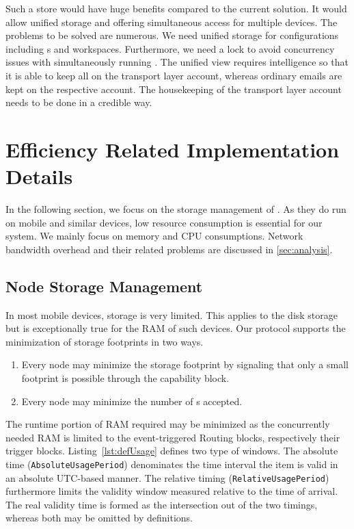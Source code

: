 Such a store would have huge benefits compared to the current solution. It would allow unified storage and offering simultaneous access for multiple devices. The problems to be solved are numerous. We need unified storage for configurations including s and workspaces. Furthermore, we need a lock to avoid concurrency issues with simultaneously running \VortexNodes{}. The unified view requires intelligence so that it is able to keep all \VortexMessages{} on the transport layer account, whereas ordinary emails are kept on the respective account. The housekeeping of the transport layer account needs to be done in a credible way. 

\chapter{Efficiency Related Implementation Details}\label{sec:efficiencyImplementation}
In the following section, we focus on the storage management of \VortexNodes{}. As they do run on mobile and similar devices, low resource consumption is essential for our system. We mainly focus on memory and CPU consumptions. Network bandwidth overhead and their related problems are discussed in \cref{sec:analysis}.

\section{Node Storage Management}
In most mobile devices, storage is very limited. This applies to the disk storage but is exceptionally true for the RAM of such devices. Our protocol supports the minimization of storage footprints in two ways.
\begin{enumerate}
	\item Every node may minimize the storage footprint by signaling that only a small footprint is possible through the capability block.
	\item Every node may minimize the number of s accepted.
\end{enumerate}

The runtime portion of RAM required may be minimized as the concurrently needed RAM is limited to the event-triggered Routing blocks, respectively their trigger blocks. Listing~\ref{lst:defUsage} defines two type of windows. The absolute time (\texttt{AbsoluteUsagePeriod}) denominates the time interval the item is valid in an absolute UTC-based manner. The relative timing (\texttt{RelativeUsagePeriod}) furthermore limits the validity window measured relative to the time of arrival. The real validity time is formed as the intersection out of the two timings, whereas both may be omitted by definitions.

